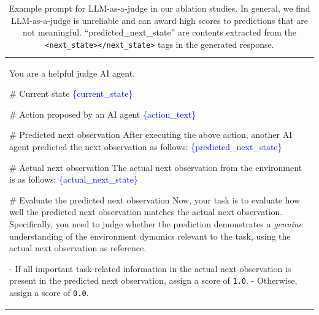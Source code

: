 \begin{table}[t!]
    \caption{Example prompt for LLM-as-a-judge in our ablation studies. In general, we find LLM-as-a-judge is unreliable and can award high scores to predictions that are not meaningful. ``predicted\_next\_state'' are contents extracted from the \texttt{<next\_state>}\texttt{</next\_state>} tags in the generated response.}
    \label{tab:alfworld_judge_example}
    \begin{tabular}{p{16.5cm}}
    \toprule
    You are a helpful judge AI agent.

    \# Current state
    \newline
    \textcolor{blue}{\{}\textcolor{blue}{current\_state}\textcolor{blue}{\}}
    \newline

    \# Action proposed by an AI agent
    \newline
    \textcolor{blue}{\{}\textcolor{blue}{action\_text}\textcolor{blue}{\}}
    \newline

    \# Predicted next observation
    \newline
    After executing the above action, another AI agent predicted the next observation as follows:
    \newline
    \textcolor{blue}{\{}\textcolor{blue}{predicted\_next\_state}\textcolor{blue}{\}}
    \newline

    \# Actual next observation
    \newline
    The actual next observation from the environment is as follows:
    \newline
    \textcolor{blue}{\{}\textcolor{blue}{actual\_next\_state}\textcolor{blue}{\}}
    \newline

    \# Evaluate the predicted next observation
    \newline
    Now, your task is to evaluate how well the predicted next observation matches the actual next observation.
    Specifically, you need to judge whether the prediction demonstrates a \emph{genuine} understanding of the environment dynamics relevant to the task, using the actual next observation as reference.
    \newline

    - If all important task-related information in the actual next observation is present in the predicted next observation, assign a score of \texttt{1.0}.
    \newline
    - Otherwise, assign a score of \texttt{0.0}.
    \newline


\end{tabular}
\end{table}
